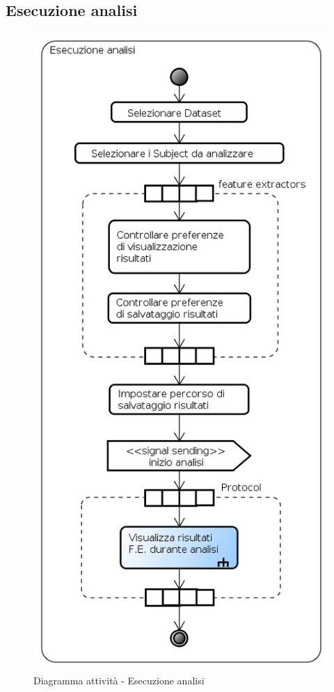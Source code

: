 \subsection{Esecuzione analisi}
\label{diagramma_analisi}
\begin{figure}[!h]
\begin{center}
\includegraphics[scale=0.6]{./img/Diagrammi_Attivita/Esecuzione_analisi}
\caption{Diagramma attività - Esecuzione analisi}
\end{center}
\end{figure}
